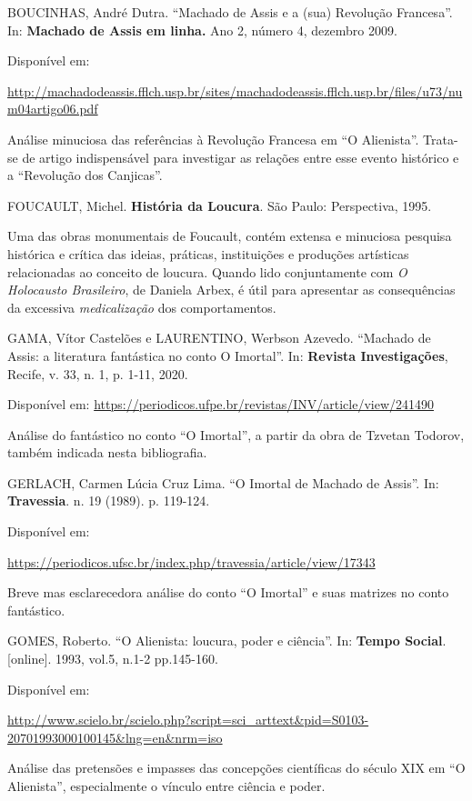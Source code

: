 \documentclass{extarticle}
\begin{document}
BOUCINHAS, André Dutra. ``Machado de Assis e a (sua) Revolução
Francesa''. In: \textbf{Machado de Assis em linha.} Ano 2, número 4,
dezembro 2009.

Disponível em:

\url{http://machadodeassis.fflch.usp.br/sites/machadodeassis.fflch.usp.br/files/u73/num04artigo06.pdf}

Análise minuciosa das referências à Revolução Francesa em ``O
Alienista''. Trata-se de artigo indispensável para investigar as
relações entre esse evento histórico e a ``Revolução dos Canjicas''.

FOUCAULT, Michel. \textbf{História da Loucura}. São Paulo: Perspectiva,
1995.

Uma das obras monumentais de Foucault, contém extensa e minuciosa
pesquisa histórica e crítica das ideias, práticas, instituições e
produções artísticas relacionadas ao conceito de loucura. Quando lido
conjuntamente com \emph{O Holocausto Brasileiro}, de Daniela Arbex, é
útil para apresentar as consequências da excessiva \emph{medicalização}
dos comportamentos.

GAMA, Vítor Castelões e LAURENTINO, Werbson Azevedo. ``Machado de Assis:
a literatura fantástica no conto O Imortal''. In: \textbf{Revista
Investigações}, Recife, v. 33, n. 1, p. 1-11, 2020.

Disponível em:
\url{https://periodicos.ufpe.br/revistas/INV/article/view/241490}

Análise do fantástico no conto ``O Imortal'', a partir da obra de
Tzvetan Todorov, também indicada nesta bibliografia.

GERLACH, Carmen Lúcia Cruz Lima. ``O Imortal de Machado de Assis''. In:
\textbf{Travessia}. n. 19 (1989). p. 119-124.

Disponível em:

\url{https://periodicos.ufsc.br/index.php/travessia/article/view/17343}

Breve mas esclarecedora análise do conto ``O Imortal'' e suas matrizes
no conto fantástico.

GOMES, Roberto. ``O Alienista: loucura, poder e ciência''. In:
\textbf{Tempo Social}. {[}online{]}. 1993, vol.5, n.1-2 pp.145-160.

Disponível em:

\url{http://www.scielo.br/scielo.php?script=sci_arttext\&pid=S0103-20701993000100145\&lng=en\&nrm=iso}

Análise das pretensões e impasses das concepções científicas do século
XIX em ``O Alienista'', especialmente o vínculo entre ciência e poder.
\end{document}
